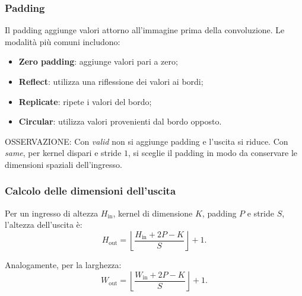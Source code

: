 \documentclass[11pt,a4paper]{article}
\begin{document}
\subsubsection{Padding}

Il padding aggiunge valori attorno all'immagine prima della convoluzione.
Le modalità più comuni includono:
\begin{itemize}
    \item \textbf{Zero padding}: aggiunge valori pari a zero;
    \item \textbf{Reflect}: utilizza una riflessione dei valori ai bordi;
    \item \textbf{Replicate}: ripete i valori del bordo;
    \item \textbf{Circular}: utilizza valori provenienti dal bordo opposto.
\end{itemize}

OSSERVAZIONE:
Con \textit{valid} non si aggiunge padding e l'uscita si riduce.
Con \textit{same}, per kernel dispari e stride $1$, si sceglie il
padding in modo da conservare le dimensioni spaziali dell'ingresso.

\subsubsection{Calcolo delle dimensioni dell'uscita}

Per un ingresso di altezza $H_{\text{in}}$, kernel di dimensione $K$,
padding $P$ e stride $S$, l'altezza dell'uscita è:
\[
H_{\text{out}}=
\left\lfloor
\frac{H_{\text{in}}+2P-K}{S}
\right\rfloor+1.
\]

Analogamente, per la larghezza:
\[
W_{\text{out}}=
\left\lfloor
\frac{W_{\text{in}}+2P-K}{S}
\right\rfloor+1.
\]





\end{document}
